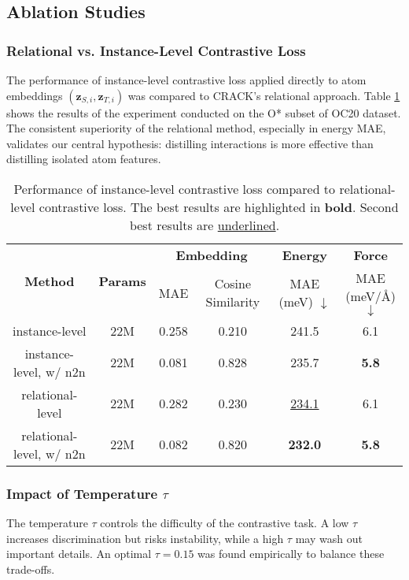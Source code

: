 \documentclass{article}
\begin{document}
\subsection{Ablation Studies}
\subsubsection{Relational vs. Instance-Level Contrastive Loss} 
The performance of instance-level contrastive loss applied directly to atom embeddings $(\mathbf{z}_{S,i}, \mathbf{z}_{T,i})$ was compared to CRACK's relational approach. 
Table \ref{tab:crack-instance-relational} shows the results of the experiment conducted on the O* subset of OC20 dataset.
The consistent superiority of the relational method, especially in energy MAE, validates our central hypothesis: distilling interactions is more effective than distilling isolated atom features.

\begin{table}[htbp]
\centering
\caption{Performance of instance-level contrastive loss compared to relational-level contrastive loss. The best results are highlighted in \textbf{bold}. Second best results are \underline{underlined}.}
\label{tab:crack-instance-relational}
\begin{adjustbox}{max width=0.8\textwidth}
\begin{threeparttable}
\begin{tabular}{cccccc}
\toprule
\multirow{2}{*}{\textbf{Method}} & \multirow{2}{*}{\textbf{Params}} & \multicolumn{2}{c}{\textbf{Embedding}} & \textbf{Energy} & \textbf{Force} \\
\cmidrule(lr){3-6}
& & MAE & Cosine Similarity & MAE (meV) $\downarrow$ & MAE (meV/Å) $\downarrow$ \\
\midrule
instance-level & 22M & 0.258 & 0.210 & 241.5 & 6.1 \\ 
instance-level, w/ n2n & 22M & 0.081 & 0.828 & 235.7 & \textbf{5.8} \\ 
relational-level & 22M & 0.282 & 0.230 & \underline{234.1} & 6.1 \\ 
relational-level, w/ n2n & 22M & 0.082 & 0.820 & \textbf{232.0} & \textbf{5.8} \\ 
\bottomrule 
\end{tabular}
\end{threeparttable}
\end{adjustbox}
\end{table}
        
\subsubsection{Impact of Temperature $\tau$} 
The temperature $\tau$ controls the difficulty of the contrastive task. 
A low $\tau$ increases discrimination but risks instability, while a high $\tau$ may wash out important details. 
An optimal $\tau=0.15$ was found empirically to balance these trade-offs.
\end{document}
